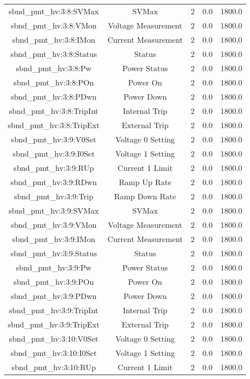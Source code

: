 \begin{center}
\begin{longtable}{c | c c c c }
sbnd\_pmt\_hv:3:8:SVMax & SVMax & 2 & 0.0 & 1800.0\\ 
sbnd\_pmt\_hv:3:8:VMon & Voltage Measurement & 2 & 0.0 & 1800.0\\ 
sbnd\_pmt\_hv:3:8:IMon & Current Measurement & 2 & 0.0 & 1800.0\\ 
sbnd\_pmt\_hv:3:8:Status & Status & 2 & 0.0 & 1800.0\\ 
sbnd\_pmt\_hv:3:8:Pw & Power Status & 2 & 0.0 & 1800.0\\ 
sbnd\_pmt\_hv:3:8:POn & Power On & 2 & 0.0 & 1800.0\\ 
sbnd\_pmt\_hv:3:8:PDwn & Power Down & 2 & 0.0 & 1800.0\\ 
sbnd\_pmt\_hv:3:8:TripInt & Internal Trip & 2 & 0.0 & 1800.0\\ 
sbnd\_pmt\_hv:3:8:TripExt & External Trip & 2 & 0.0 & 1800.0\\ 
sbnd\_pmt\_hv:3:9:V0Set & Voltage 0 Setting & 2 & 0.0 & 1800.0\\ 
sbnd\_pmt\_hv:3:9:I0Set & Voltage 1 Setting & 2 & 0.0 & 1800.0\\ 
sbnd\_pmt\_hv:3:9:RUp & Current 1 Limit & 2 & 0.0 & 1800.0\\ 
sbnd\_pmt\_hv:3:9:RDwn & Ramp Up Rate & 2 & 0.0 & 1800.0\\ 
sbnd\_pmt\_hv:3:9:Trip & Ramp Down Rate & 2 & 0.0 & 1800.0\\ 
sbnd\_pmt\_hv:3:9:SVMax & SVMax & 2 & 0.0 & 1800.0\\ 
sbnd\_pmt\_hv:3:9:VMon & Voltage Measurement & 2 & 0.0 & 1800.0\\ 
sbnd\_pmt\_hv:3:9:IMon & Current Measurement & 2 & 0.0 & 1800.0\\ 
sbnd\_pmt\_hv:3:9:Status & Status & 2 & 0.0 & 1800.0\\ 
sbnd\_pmt\_hv:3:9:Pw & Power Status & 2 & 0.0 & 1800.0\\ 
sbnd\_pmt\_hv:3:9:POn & Power On & 2 & 0.0 & 1800.0\\ 
sbnd\_pmt\_hv:3:9:PDwn & Power Down & 2 & 0.0 & 1800.0\\ 
sbnd\_pmt\_hv:3:9:TripInt & Internal Trip & 2 & 0.0 & 1800.0\\ 
sbnd\_pmt\_hv:3:9:TripExt & External Trip & 2 & 0.0 & 1800.0\\ 
sbnd\_pmt\_hv:3:10:V0Set & Voltage 0 Setting & 2 & 0.0 & 1800.0\\ 
sbnd\_pmt\_hv:3:10:I0Set & Voltage 1 Setting & 2 & 0.0 & 1800.0\\ 
sbnd\_pmt\_hv:3:10:RUp & Current 1 Limit & 2 & 0.0 & 1800.0\\ 

\end{longtable}
\end{center}
